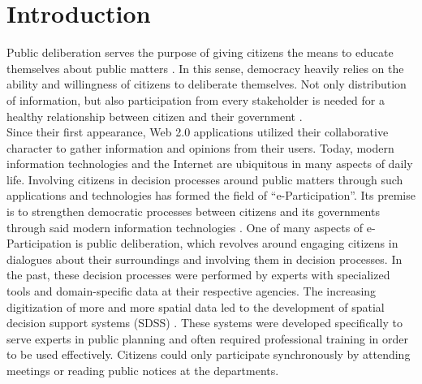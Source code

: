 \section{Introduction}
Public deliberation serves the purpose of giving citizens the means to educate themselves about public matters \cite{page1996deliberates}. In this sense, democracy heavily relies on the ability and willingness of citizens to deliberate themselves. Not only distribution of information, but also participation from every stakeholder is needed for a healthy relationship between citizen and their government \cite{Arnstein1969_citizen_participation}.\\
Since their first appearance, Web 2.0 applications utilized their collaborative character to gather information and opinions from their users. Today, modern information technologies and the Internet are ubiquitous in many aspects of daily life. Involving citizens in decision processes around public matters through such applications and technologies has formed the field of ``e-Participation''. Its premise is to strengthen democratic processes between citizens and its governments through said modern information technologies \cite{Saebo_eParticipation, Medaglia2012_eParticipation}. One of many aspects of e-Participation is public deliberation, which revolves around engaging citizens in dialogues about their surroundings and involving them in decision processes. In the past, these decision processes were performed by experts with specialized tools and domain-specific data at their respective agencies. The increasing digitization of more and more spatial data led to the development of spatial decision support systems (SDSS) \cite{densham_sdss}. These systems were developed specifically to serve experts in public planning and often required professional training in order to be used effectively. Citizens could only participate synchronously by attending meetings or reading public notices at the departments. 

